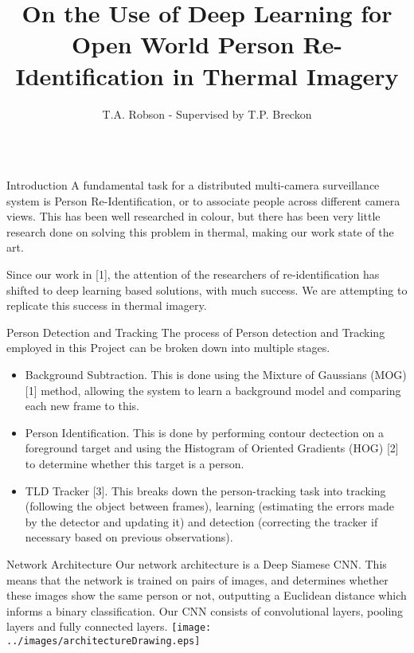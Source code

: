 \documentclass[final]{beamer}
\title[Thermal Re-ID]{On the Use of Deep Learning for Open World Person Re-Identification in Thermal Imagery}
\author{T.A. Robson - Supervised by T.P. Breckon}
\institute[Durham]{Department of Computer Science, Durham University}
\begin{document}
  \begin{frame}{} 

 
  
        
    \begin{columns}[t]
      \begin{column}{.5\linewidth}
      
      	\begin{block}{Introduction}
          A fundamental task for a distributed multi-camera surveillance system is Person Re-Identification, or to associate people across different camera views. This has been well researched in colour, but there has been very little research done on solving this problem in thermal, making our work state of the art. 
          
          Since our work in [1], the attention of the researchers of re-identification has shifted to deep learning based solutions, with much success. We are attempting to replicate this success in thermal imagery.
          
        \end{block}
        
        \begin{block}{Person Detection and Tracking}
        	The process of Person detection and Tracking employed in this Project can be broken down into multiple stages. 
        	\begin{itemize}
        	\item Background Subtraction. This is done using the Mixture of Gaussians (MOG) [1] method, allowing the system to learn a background model and comparing each new frame to this. 

        	\item Person Identification. This is done by performing contour dectection on a foreground target and using the Histogram of Oriented Gradients (HOG) [2] to determine whether this target is a person.
        	
        	\item TLD Tracker [3]. This breaks down the person-tracking task into tracking (following the object between frames), learning (estimating the errors made by the detector and updating it) and detection (correcting the tracker if necessary based on previous observations). 
          \end{itemize}
        \end{block}
       


        \begin{block}{Network Architecture}
        Our network architecture is a Deep Siamese CNN. This means that the network is trained on pairs of images, and determines whether these images show the same person or not, outputting a Euclidean distance which informs a binary classification. Our CNN consists of convolutional layers, pooling layers and fully connected layers. 
        \texttt{[image: ../images/architectureDrawing.eps]}
        \end{block}
	

\end{column}
\end{columns}
\end{frame}
\end{document}
